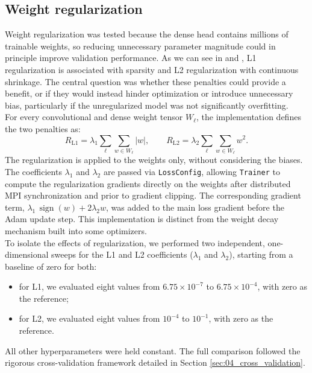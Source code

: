 \subsection{Weight regularization}
\label{sec:04_regularization_tuning}

Weight regularization was tested because the dense head contains millions of trainable weights, so reducing unnecessary parameter magnitude could in principle improve validation performance. As we can see in \cite{tibshirani1996lasso} and \cite{hoerl1970ridge}, L1 regularization is associated with sparsity and L2 regularization with continuous shrinkage. The central question was whether these penalties could provide a benefit, or if they would instead hinder optimization or introduce unnecessary bias, particularly if the unregularized model was not significantly overfitting.\\

For every convolutional and dense weight tensor $W_\ell$, the implementation defines the two penalties as:
\begin{equation}
    R_{\mathrm{L1}}=\lambda_1\sum_{\ell}\sum_{w\in W_\ell}|w|,
    \qquad
    R_{\mathrm{L2}}=\lambda_2\sum_{\ell}\sum_{w\in W_\ell}w^2.
    \label{eq:04_regularization}
\end{equation}
The regularization is applied to the weights only, without considering the biases. The coefficients $\lambda_1$ and $\lambda_2$ are passed via \texttt{LossConfig}, allowing \texttt{Trainer} to compute the regularization gradients directly on the weights after distributed MPI synchronization and prior to gradient clipping. The corresponding gradient term, $\lambda_1\,\operatorname{sign}(w)+2\lambda_2 w$, was added to the main loss gradient before the Adam update step. This implementation is distinct from the weight decay mechanism built into some optimizers.\\

To isolate the effects of regularization, we performed two independent, one-dimensional sweeps for the L1 and L2 coefficients ($\lambda_1$ and $\lambda_2$), starting from a baseline of zero for both:
\begin{itemize}
    \item[-] for L1, we evaluated eight values from $6.75\times 10^{-7}$ to $6.75\times 10^{-4}$, with zero as the reference;
    \item[-] for L2, we evaluated eight values from $10^{-4}$ to $10^{-1}$, with zero as the reference. 
\end{itemize}
All other hyperparameters were held constant. The full comparison followed the rigorous cross-validation framework detailed in Section \ref{sec:04_cross_validation}.\\

